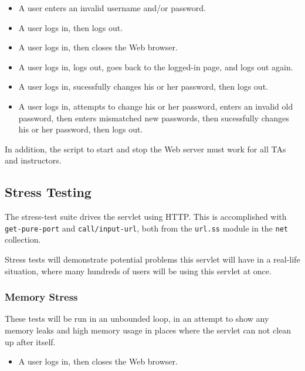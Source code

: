 \documentclass{article}
\begin{document}
\begin{itemize}
\item{A user enters an invalid username and/or password.}
\item{A user logs in, then logs out.}
\item{A user logs in, then closes the Web browser.}
\item{A user logs in, logs out, goes back to the logged-in page, and logs out
again.}
\item{A user logs in, sucessfully changes his or her password, then logs out.}
\item{A user logs in, attempts to change his or her password, enters an invalid
old password, then enters mismatched new passwords, then sucessfully changes his or
her password, then logs out.}
\end{itemize}

In addition, the script to start and stop the Web server must work for all TAs
and instructors.

\subsection{Stress Testing}\label{subsec:stresstests}

The stress-test suite drives the servlet using HTTP. This is accomplished with
\verb|get-pure-port| and \verb|call/input-url|, both from the \verb|url.ss|
module in the \verb|net| collection.

Stress tests will demonstrate potential problems this servlet will have in a
real-life situation, where many hundreds of users will be using this servlet
at once.

\subsubsection{Memory Stress}\label{subsubsec:mem-stress}

These tests will be run in an unbounded loop, in an attempt to show any memory
leaks and high memory usage in places where the servlet can not clean up after
itself.

\begin{itemize}
\item{A user logs in, then closes the Web browser.}
\end{itemize}
\end{document}
